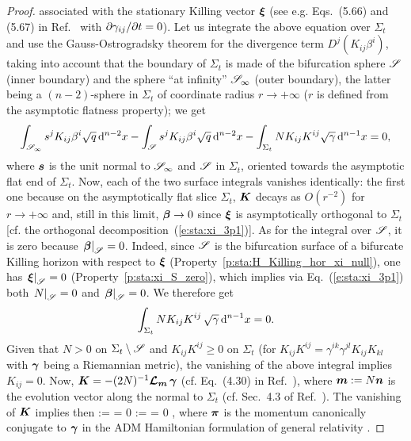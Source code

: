 \begin{proof}
associated with the stationary Killing vector $\bm{\xi}$ (see e.g. Eqs.~(5.66) and
(5.67) in Ref.~\cite{Gourg12} with ${\partial \gamma_{ij}}/{\partial t} = 0$).
Let us integrate the above equation over $\Sigma_t$ and
use the Gauss-Ostrogradsky theorem for the divergence term
$D^j \left( K_{ij} \beta^i \right)$, taking into account that
the boundary of $\Sigma_t$ is made
of the bifurcation sphere $\mathscr{S}$ (inner boundary) and the sphere ``at infinity''
$\mathscr{S}_\infty$ (outer boundary), the latter being a $(n-2)$-sphere in $\Sigma_t$
of coordinate radius $r\to +\infty$ ($r$ is defined from the asymptotic flatness
property); we get
\[
    \int_{\mathscr{S}_\infty} s^j K_{ij} \beta^i \sqrt{q} \,  \mathrm{d}^{n-2} x
    - \int_{\mathscr{S}} s^j K_{ij} \beta^i \sqrt{q} \, \mathrm{d}^{n-2} x
    -  \int_{\Sigma_t} N K_{ij} K^{ij}  \sqrt{\gamma} \, \mathrm{d}^{n-1} x =  0 ,
\]
where $\bm{s}$ is the unit normal to $\mathscr{S}_\infty$ and $\mathscr{S}$ in $\Sigma_t$,
oriented towards the asymptotic flat end of $\Sigma_t$. Now, each of the two surface
integrals vanishes identically:
the first one because on the asymptotically flat slice $\Sigma_t$, $\bm{K}$ decays
as $O(r^{-2})$ for $r\to +\infty$ and, still in this limit,  $\bm{\beta}\to 0$
since $\bm{\xi}$ is asymptotically orthogonal to $\Sigma_t$
[cf. the orthogonal decomposition~(\ref{e:sta:xi_3p1})].
As for the integral over $\mathscr{S}$, it is zero because
$\left. \bm{\beta} \right| _{\mathscr{S}} =  0$.
Indeed, since $\mathscr{S}$ is the bifurcation surface of a bifurcate Killing
horizon with respect to $\bm{\xi}$ (Property~\ref{p:sta:H_Killing_hor_xi_null}),
one has  $\left. \bm{\xi} \right| _{\mathscr{S}} = 0$ (Property~\ref{p:sta:xi_S_zero}),
which implies via Eq.~(\ref{e:sta:xi_3p1}) both $\left. N \right| _{\mathscr{S}} = 0$ and
$\left. \bm{\beta} \right| _{\mathscr{S}} = 0$. We therefore get
\[
    \int_{\Sigma_t} N K_{ij} K^{ij} \, \sqrt{\gamma} \, \mathrm{d}^{n-1} x = 0 .
\]
Given that $N > 0$ on $\Sigma_t\setminus \mathscr{S}$ and $K_{ij} K^{ij} \geq 0$ on $\Sigma_t$ (for
$K_{ij} K^{ij} = \gamma^{ik} \gamma^{jl} K_{ij} K_{kl}$ with
$\bm{\gamma}$ being a Riemannian metric), the vanishing of the above integral
implies $K_{ij} = 0$.
Now, $\bm{K} = - (2N)^{-1} \bm{\mathcal{L}}_{\bm{m}}\, \bm{\gamma}$ (cf. Eq.~(4.30) in Ref.~\cite{Gourg12}), where $\bm{m} := N \bm{n}$
is the evolution vector along the normal to $\Sigma_t$ (cf. Sec.~4.3 of Ref.~\cite{Gourg12}).
The vanishing of $\bm{K}$ implies then
\be \label{e:sta:dot_gamma_dot_pi}
   \dot{\w{\gamma}} :=   \w{\gamma} = 0 \qand
   \dot{\w{\pi}} :=   \w{\pi} = 0 ,
\ee
where $\bm{\pi}$ is the momentum canonically conjugate to $\bm{\gamma}$ in
the ADM Hamiltonian formulation of general relativity \cite{ArnowDM62,FischM79}.

\end{proof}
